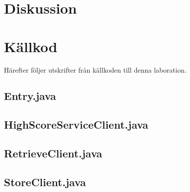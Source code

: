 \documentclass[a4paper, 12pt]{article}
\begin{document}
\section{Diskussion}\label{Diskussion}

\newpage
\appendix
{}
\section{Källkod}\label{Kallkod}
Härefter följer utskrifter från källkoden till denna laboration.

\newpage
\subsection{Entry.java}\label{Entry.java}
\begin{footnotesize}
  
\end{footnotesize}

\newpage
\subsection{HighScoreServiceClient.java}\label{HighScoreServiceClient.java}
\begin{footnotesize}
  
\end{footnotesize}

\newpage
\subsection{RetrieveClient.java}\label{RetrieveClient.java}
\begin{footnotesize}
  
\end{footnotesize}

\newpage
\subsection{StoreClient.java}\label{StoreClient.java}
\begin{footnotesize}
  
\end{footnotesize}
\end{document}
